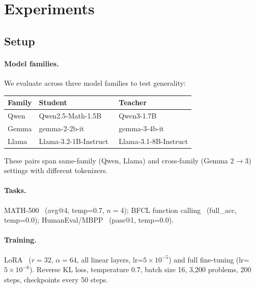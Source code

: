 \documentclass[10pt]{article}
\begin{document}
\section{Experiments}
\label{sec:experiments}

\subsection{Setup}
\label{sec:setup}

\paragraph{Model families.} We evaluate across three model families to test generality:

\begin{table}[h]
\centering
\small
\begin{tabular}{lll}
\toprule
\textbf{Family} & \textbf{Student} & \textbf{Teacher} \\
\midrule
Qwen & Qwen2.5-Math-1.5B~\citep{qwen2024qwen25math} & Qwen3-1.7B~\citep{qwen2025qwen3} \\
Gemma & gemma-2-2b-it~\citep{team2024gemma2} & gemma-3-4b-it~\citep{team2025gemma3} \\
Llama & Llama-3.2-1B-Instruct~\citep{grattafiori2024llama3} & Llama-3.1-8B-Instruct \\
\bottomrule
\end{tabular}
\end{table}

\noindent These pairs span same-family (Qwen, Llama) and cross-family (Gemma 2$\to$3) settings with different tokenizers.

\paragraph{Tasks.} MATH-500~\citep{hendrycks2021measuring, lightman2023verify} (avg@4, temp=0.7, $n{=}4$); BFCL function calling~\citep{yan2024bfcl} (full\_acc, temp=0.0); HumanEval/MBPP~\citep{chen2021evaluating, liu2024evalplus} (pass@1, temp=0.0).

\paragraph{Training.} LoRA~\citep{hu2022lora} ($r{=}32$, $\alpha{=}64$, all linear layers, lr=$5{\times}10^{-5}$) and full fine-tuning (lr=$5{\times}10^{-6}$). Reverse KL loss, temperature 0.7, batch size 16, 3{,}200 problems, 200 steps, checkpoints every 50 steps.
\end{document}
